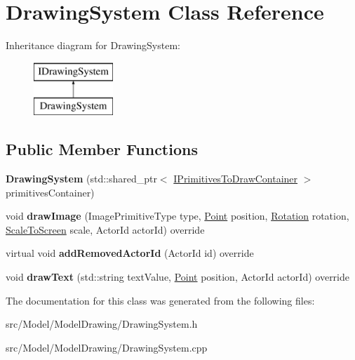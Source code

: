 \hypertarget{classDrawingSystem}{}\section{Drawing\+System Class Reference}
\label{classDrawingSystem}
Inheritance diagram for Drawing\+System\+:\begin{figure}[H]
\begin{center}
\leavevmode
\includegraphics[height=2.000000cm]{classDrawingSystem}
\end{center}
\end{figure}
\subsection*{Public Member Functions}
\begin{DoxyCompactItemize}
\item 
{\bfseries Drawing\+System} (std\+::shared\+\_\+ptr$<$ \hyperlink{classIPrimitivesToDrawContainer}{I\+Primitives\+To\+Draw\+Container} $>$ primitives\+Container)\hypertarget{classDrawingSystem_ac43192217e05834885ac57ff96fcbeb1}{}\label{classDrawingSystem_ac43192217e05834885ac57ff96fcbeb1}

\item 
void {\bfseries draw\+Image} (Image\+Primitive\+Type type, \hyperlink{classPoint}{Point} position, \hyperlink{classRotation}{Rotation} rotation, \hyperlink{classScaleToScreen}{Scale\+To\+Screen} scale, Actor\+Id actor\+Id) override\hypertarget{classDrawingSystem_ae7a1ecfeebb570e4d2d8b6444ca1d5e8}{}\label{classDrawingSystem_ae7a1ecfeebb570e4d2d8b6444ca1d5e8}

\item 
virtual void {\bfseries add\+Removed\+Actor\+Id} (Actor\+Id id) override\hypertarget{classDrawingSystem_a6e4afe9218b8bddfd7c6b0e2cae96c69}{}\label{classDrawingSystem_a6e4afe9218b8bddfd7c6b0e2cae96c69}

\item 
void {\bfseries draw\+Text} (std\+::string text\+Value, \hyperlink{classPoint}{Point} position, Actor\+Id actor\+Id) override\hypertarget{classDrawingSystem_a03b52bea5d3a0f7a826893eb80e09c98}{}\label{classDrawingSystem_a03b52bea5d3a0f7a826893eb80e09c98}

\end{DoxyCompactItemize}


The documentation for this class was generated from the following files\+:\begin{DoxyCompactItemize}
\item 
src/\+Model/\+Model\+Drawing/Drawing\+System.\+h\item 
src/\+Model/\+Model\+Drawing/Drawing\+System.\+cpp\end{DoxyCompactItemize}
